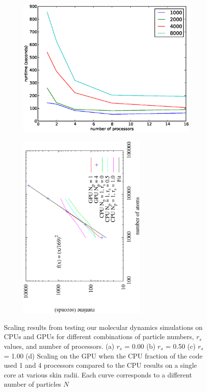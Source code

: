 \documentclass[12pt]{article}
\begin{document}
\begin{figure}[H]
\begin{subfigure}{0.5\textwidth}
	\includegraphics[width=\textwidth]{scalingtiger_rs_100}
	\caption{}
	\end{subfigure}
	\begin{subfigure}{0.5\textwidth}
	\includegraphics[width=0.7\textwidth, angle=-90]{gpu_time.eps}
	\caption{}
	\end{subfigure}
	\caption{Scaling results from testing our molecular dynamics simulations on CPUs and GPUs for different combinations of particle numbers, $r_{s}$ values, and number of processors. (a) $r_{s}$ = 0.00 (b) $r_{s}$ = 0.50 (c) $r_{s}$ = 1.00 (d) Scaling on the GPU when the CPU fraction of the code used 1 and 4 processors compared to the CPU results on a single core at various skin radii. Each curve corresponds to a different number of particles $N$}
	\label{fig:scaling_compare}
\end{figure}
\end{document}
